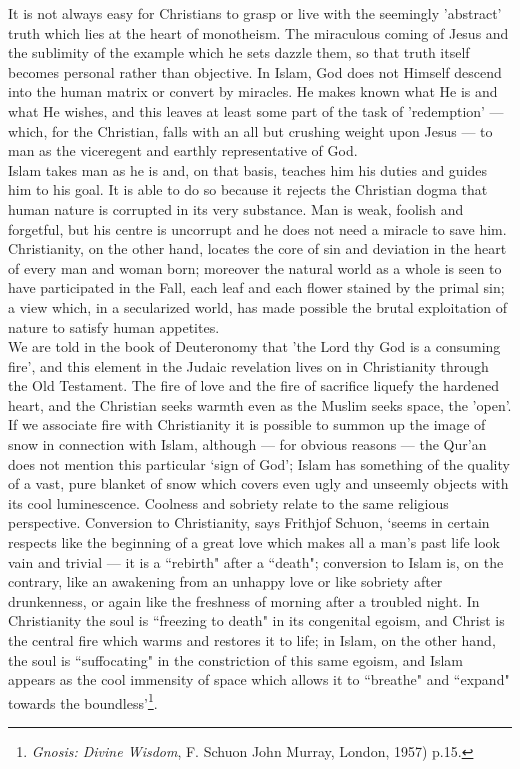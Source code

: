 \documentclass[10pt, twoside]{book}
\begin{document}
It is not always easy for Christians to grasp or live with the seemingly 'abstract' truth which lies 
at the heart of monotheism. The miraculous coming of Jesus and the sublimity of the example which he 
sets dazzle them, so that truth itself becomes personal rather than objective. In Islam, God does not 
Himself descend into the human matrix or convert by miracles. He makes known what He is and what He 
wishes, and this leaves at least some part of the task of 'redemption' --- which, for the Christian, 
falls with an all but crushing weight upon Jesus --- to man as the viceregent and earthly 
representative of God. \\

Islam takes man as he is and, on that basis, teaches him his duties and guides him to his goal. It is 
able to do so because it rejects the Christian dogma that human nature is corrupted in its very 
substance. Man is weak, foolish and forgetful, but his centre is uncorrupt and he does not need a 
miracle to save him. Christianity, on the other hand, locates the core of sin and deviation in the 
heart of every man and woman born; moreover the natural world as a whole is seen to have participated 
in the Fall, each leaf and each flower stained by the primal sin; a view which, in a secularized 
world, has made possible the brutal exploitation of nature to satisfy human appetites. \\

We are told in the book of Deuteronomy that 'the Lord thy God is a consuming fire', and this element 
in the Judaic revelation lives on in Christianity through the Old Testament. The fire of love and the 
fire of sacrifice liquefy the hardened heart, and the Christian seeks warmth even as the Muslim seeks 
space, the 'open'. If we associate fire with Christianity it is possible to summon up the image of 
snow in connection with Islam, although --- for obvious reasons --- the Qur'an does not mention this 
particular `sign of God'; Islam has something of the quality of a vast, pure blanket of snow which 
covers even ugly and unseemly objects with its cool luminescence. Coolness and sobriety relate to the 
same religious perspective. Conversion to Christianity, says Frithjof Schuon, `seems in certain 
respects like the beginning of a great love which makes all a man's past life look vain and trivial --- 
it is a ``rebirth" after a ``death"; conversion to Islam is, on the contrary, like an awakening from an 
unhappy love or like sobriety after drunkenness, or again like the freshness of morning after a 
troubled night. In Christianity the soul is ``freezing to death" in its congenital egoism, and Christ 
is the central fire which warms and restores it to life; in Islam, on the other hand, the soul is 
``suffocating" in the constriction of this same egoism, and Islam appears as the cool immensity of 
space which allows it to ``breathe" and ``expand" towards the boundless'\footnote{\emph{Gnosis: Divine Wisdom}, F. Schuon John Murray, London, 1957) p.15.}. \\
\end{document}

